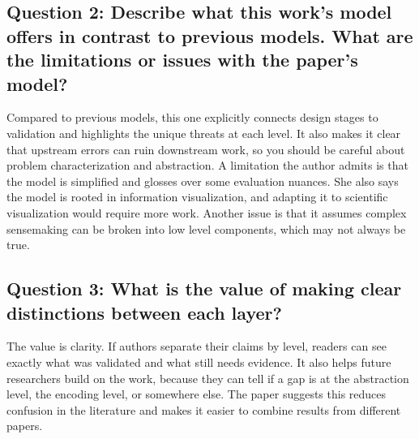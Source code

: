 \documentclass[11pt]{article}
\begin{document}
\subsection*{Question 2: Describe what this work's model offers in contrast to previous models. What are the limitations or issues with the paper's model?}

Compared to previous models, this one explicitly connects design stages to validation and highlights the unique threats at each level. It also makes it clear that upstream errors can ruin downstream work, so you should be careful about problem characterization and abstraction. A limitation the author admits is that the model is simplified and glosses over some evaluation nuances. She also says the model is rooted in information visualization, and adapting it to scientific visualization would require more work. Another issue is that it assumes complex sensemaking can be broken into low level components, which may not always be true.

\subsection*{Question 3: What is the value of making clear distinctions between each layer?}

The value is clarity. If authors separate their claims by level, readers can see exactly what was validated and what still needs evidence. It also helps future researchers build on the work, because they can tell if a gap is at the abstraction level, the encoding level, or somewhere else. The paper suggests this reduces confusion in the literature and makes it easier to combine results from different papers.
\end{document}
